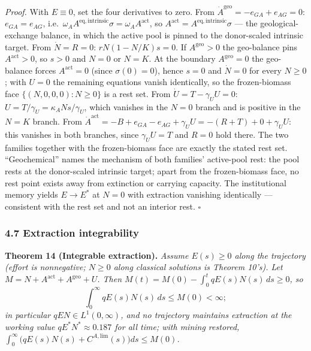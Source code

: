 \documentclass[11pt]{article}
\begin{document}
\emph{Proof.} With \(E \equiv 0\), set the four derivatives to zero.
From \(\dot A^{\mathrm{geo}} = -e_{GA} + e_{AG} = 0\):
\(e_{GA} = e_{AG}\),
i.e.~\(\omega_A A^{\mathrm{eq,intrinsic}} \sigma = \omega_A A^{\mathrm{act}}\),
so \(A^{\mathrm{act}} = A^{\mathrm{eq,intrinsic}} \sigma\) --- the
geological-exchange balance, in which the active pool is pinned to the
donor-scaled intrinsic target. From \(\dot N = R = 0\):
\(rN(1 - N/K)s = 0\). If \(A^{\mathrm{geo}} > 0\) the geo-balance pins
\(A^{\mathrm{act}} > 0\), so \(s > 0\) and \(N = 0\) or \(N = K\). At
the boundary \(A^{\mathrm{geo}} = 0\) the geo-balance forces
\(A^{\mathrm{act}} = 0\) (since \(\sigma(0) = 0\)), hence \(s = 0\) and
\(\dot N = 0\) for every \(N \ge 0\); with \(U = 0\) the remaining
equations vanish identically, so the frozen-biomass face
\(\{(N, 0, 0, 0) : N \ge 0\}\) is a rest set. From
\(\dot U = T - \gamma_U U = 0\):
\(U = T/\gamma_U = \kappa_A N s/\gamma_U\), which vanishes in the
\(N = 0\) branch and is positive in the \(N = K\) branch. From
\(\dot A^{\mathrm{act}} = -B + e_{GA} - e_{AG} + \gamma_U U = -(R + T) + 0 + \gamma_U U\):
this vanishes in both branches, since \(\gamma_U U = T\) and \(R = 0\)
hold there. The two families together with the frozen-biomass face are
exactly the stated rest set. ``Geochemical'' names the mechanism of both
families' active-pool rest: the pool rests at the donor-scaled intrinsic
target; apart from the frozen-biomass face, no rest point exists away
from extinction or carrying capacity. The institutional memory yields
\(E \to E^*\) at \(N = 0\) with extraction vanishing identically ---
consistent with the rest set and not an interior rest. \ensuremath{\square}

\subsubsection{4.7 Extraction
integrability}\label{extraction-integrability}

\textbf{Theorem 14 (Integrable extraction).} \emph{Assume \(E(s) \ge 0\)
along the trajectory (effort is nonnegative; \(N \ge 0\) along classical
solutions is Theorem 10's). Let
\(M = N + A^{\mathrm{act}} + A^{\mathrm{geo}} + U\). Then
\(M(t) = M(0) - \int_0^t qE(s)N(s)\, ds \ge 0\), so}
\[\int_0^\infty qE(s)N(s)\, ds \le M(0) < \infty;\] \emph{in particular
\(qEN \in L^1(0,\infty)\), and no trajectory maintains extraction at the
working value \(qE^*N^* \approx 0.187\) for all time; with mining
restored,
\(\int_0^\infty \bigl( qE(s)N(s) + C^{A,\mathrm{lim}}(s) \bigr) ds \le M(0)\).}
\end{document}
